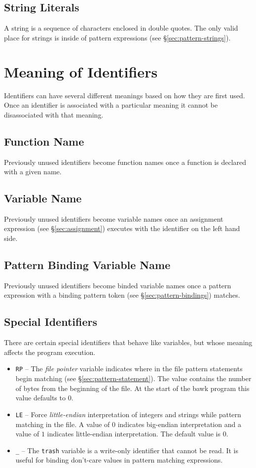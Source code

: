 \subsection{String Literals}
\label{sec:strings}
A string is a sequence of characters enclosed in double quotes.  The only valid place for strings is inside of pattern expressions (see \S\ref{sec:pattern-strings}).

\section{Meaning of Identifiers}
Identifiers can have several different meanings based on how they are first used.  Once an identifier is associated with a particular meaning it cannot be disassociated with that meaning.

\subsection{Function Name}
Previously unused identifiers become function names once a function is declared with a given name.

\subsection{Variable Name}
\label{sec:variables}
Previously unused identifiers become variable names once an assignment expression (see \S\ref{sec:assignment}) executes with the identifier on the left hand side.

\subsection{Pattern Binding Variable Name}
\label{sec:bind-variables}
Previously unused identifiers become binded variable names once a pattern expression with a binding pattern token (see \S\ref{sec:pattern-bindings}) matches.

\subsection{Special Identifiers}
\label{sec:special-identifiers}
There are certain special identifiers that behave like variables, but whose meaning affects the program execution.
\begin{itemize}
\item \texttt{RP} -- The \textsl{file pointer} variable  indicates where in the file pattern statements begin matching (see \S\ref{sec:pattern-statement}).  The value contains the number of bytes from the beginning of the file.  At the start of the bawk program this value defaults to $0$.
\item \texttt{LE} -- Force \textsl{little-endian} interpretation of integers and strings while pattern matching in the file.  A value of $0$ indicates big-endian interpretation and a value of $1$ indicates little-endian interpretation.  The default value is $0$.
\item \texttt{\_} -- The \texttt{trash} variable is a write-only identifier that cannot be read.  It is useful for binding don't-care values in pattern matching expressions.
\end{itemize}

